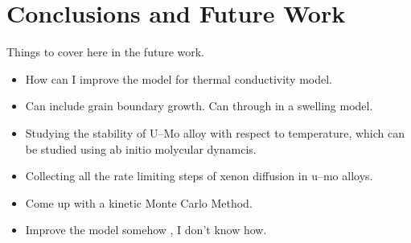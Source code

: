 \chapter{Conclusions and Future Work}
Things to cover here in the future work.

\begin{itemize}
	\item How can I improve the model for thermal conductivity model.
	\item Can include grain boundary growth. Can through in a swelling model.
	\item Studying the stability of U--Mo alloy with respect to temperature, which can be studied using ab initio molycular dynamcis.
	\item Collecting all the rate limiting steps of xenon diffusion in u--mo alloys.
	\item Come up with a kinetic Monte Carlo Method.
	\item Improve the model somehow , I don't know how.


\end{itemize}





